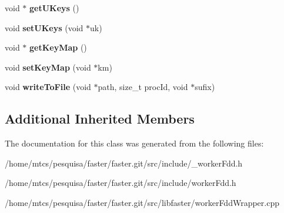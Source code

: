 \begin{DoxyCompactItemize}
void $\ast$ {\bfseries get\+U\+Keys} ()
\item 
\hypertarget{classfaster_1_1workerFdd_af480e406fb63911aceed205f5ce7b6aa}{}\label{classfaster_1_1workerFdd_af480e406fb63911aceed205f5ce7b6aa} 
void {\bfseries set\+U\+Keys} (void $\ast$uk)
\item 
\hypertarget{classfaster_1_1workerFdd_a59af3d0db373910432ac26eeae2fa839}{}\label{classfaster_1_1workerFdd_a59af3d0db373910432ac26eeae2fa839} 
void $\ast$ {\bfseries get\+Key\+Map} ()
\item 
\hypertarget{classfaster_1_1workerFdd_ab63cb6ac2a59d0871e671b042d4b8629}{}\label{classfaster_1_1workerFdd_ab63cb6ac2a59d0871e671b042d4b8629} 
void {\bfseries set\+Key\+Map} (void $\ast$km)
\item 
\hypertarget{classfaster_1_1workerFdd_a8306f424d8507b4a6ddf204ec1f428ca}{}\label{classfaster_1_1workerFdd_a8306f424d8507b4a6ddf204ec1f428ca} 
void {\bfseries write\+To\+File} (void $\ast$path, size\+\_\+t proc\+Id, void $\ast$sufix)
\end{DoxyCompactItemize}
\subsection*{Additional Inherited Members}


The documentation for this class was generated from the following files\+:\begin{DoxyCompactItemize}
\item 
/home/mtcs/pesquisa/faster/faster.\+git/src/include/\+\_\+worker\+Fdd.\+h\item 
/home/mtcs/pesquisa/faster/faster.\+git/src/include/worker\+Fdd.\+h\item 
/home/mtcs/pesquisa/faster/faster.\+git/src/libfaster/worker\+Fdd\+Wrapper.\+cpp\end{DoxyCompactItemize}
